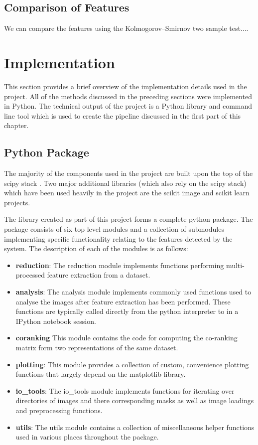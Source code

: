\subsection{Comparison of Features}
We can compare the features using the Kolmogorov–Smirnov two sample test....

\section{Implementation}
\label{sec:implementation}
This section provides a brief overview of the implementation details used in the project. All of the methods discussed in the preceding sections were implemented in Python. The technical output of the project is a Python library and command line tool which is used to create the pipeline discussed in the first part of this chapter.

\subsection{Python Package}
The majority of the components used in the project are built upon the top of the scipy stack \cite{jones2014scipy}. Two major additional libraries (which also rely on the scipy stack) which have been used heavily in the project are the scikit image \cite{van2014scikit} and scikit learn \cite{pedregosa2011scikit} projects.

The library created as part of this project forms a complete python package. The package consists of six top level modules and a collection of submodules implementing specific functionality relating to the features detected by the system. The description of each of the modules is as follows:

\begin{itemize}
	\item {\bf reduction}: The reduction module implements functions performing multi-processed feature extraction from a dataset.
	\item {\bf analysis}: The analysis module implements commonly used functions used to analyse the images after feature extraction has been performed. These functions are typically called directly from the python interpreter to in a IPython notebook session.
	\item {\bf coranking} This module contains the code for computing the co-ranking matrix form two representations of the same dataset.
	\item {\bf plotting}: This module provides a collection of custom, convenience plotting functions that largely depend on the matplotlib library.
	\item {\bf io\_tools}: The io\_tools module implements functions for iterating over directories of images and there corresponding masks as well as image loadings and preprocessing functions.
	\item {\bf utils}: The utils module contains a collection of miscellaneous helper functions used in various places throughout the package.
\end{itemize}

